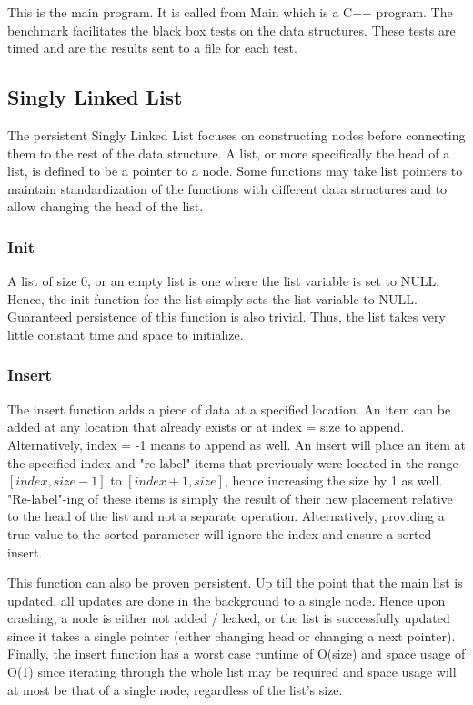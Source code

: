 \documentclass[twocolumn]{article}
\begin{document}
This is the main program. It is called from Main which is a C++ program. The
benchmark facilitates the black box tests on the data structures. These tests
are timed and are the results sent to a file for each test.

\subsection{Singly Linked List}

The persistent Singly Linked List focuses on constructing nodes before
connecting them to the rest of the data structure. A list, or more specifically
the head of a list, is defined to be a pointer to a node. Some functions may
take list pointers to maintain standardization of the functions with different
data structures and to allow changing the head of the list.

\subsubsection{Init}

A list of size 0, or an empty list is one where the list variable is set to
NULL. Hence, the init function for the list simply sets the list variable to
NULL. Guaranteed persistence of this function is also trivial. Thus, the list
takes very little constant time and space to initialize.

\subsubsection{Insert}

The insert function adds a piece of data at a specified location. An item can be
added at any location that already exists or at index = size to append.
Alternatively, index = -1 means to append as well. An insert will place an item
at the specified index and "re-label" items that previously were located in the
range $[index,size-1]$ to $[index+1,size]$, hence increasing the size by 1 as
well. "Re-label"-ing of these items is simply the result of their new placement
relative to the head of the list and not a separate operation. Alternatively,
providing a true value to the sorted parameter will ignore the index and ensure
a sorted insert.

This function can also be proven persistent. Up till the point that the main
list is updated, all updates are done in the background to a single node. Hence
upon crashing, a node is either not added / leaked, or the list is successfully
updated since it takes a single pointer (either changing head or changing a next
pointer). Finally, the insert function has a worst case runtime of O(size) and
space usage of O(1) since iterating through the whole list may be required and
space usage will at most be that of a single node, regardless of the list's
size.
\end{document}
